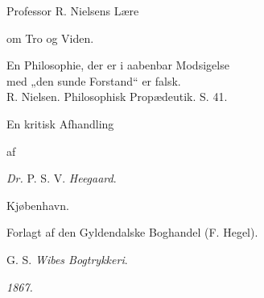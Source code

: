 \documentclass[12pt,a4paper]{book}
\begin{document}
\thispagestyle{empty}
\begin{center}
{\Huge Professor R. Nielsens Lære}\par
\bigskip
{\Huge om Tro og Viden.}\par
\bigskip
\hfill\begin{minipage}{0.62\textwidth}\small
En Philosophie, der er i aabenbar Modsigelse\\
med „den sunde Forstand“ er falsk.\\
\hspace*{1.5em}R. Nielsen. Philosophisk Propædeutik. S. 41.
\end{minipage}\par
\vspace{2\baselineskip}
{\Large En kritisk Afhandling}\par
\medskip
af\par
\medskip
{\LARGE \textit{Dr.} P. S. V. \emph{Heegaard}.}\par
\vspace{4\baselineskip}
{\large Kjøbenhavn.}\par
\medskip
Forlagt af den Gyldendalske Boghandel (F. Hegel).\par
\smallskip
G. S. \emph{Wibes Bogtrykkeri}.\par
\smallskip
\textit{1867.}\par
\end{center}
\end{document}
